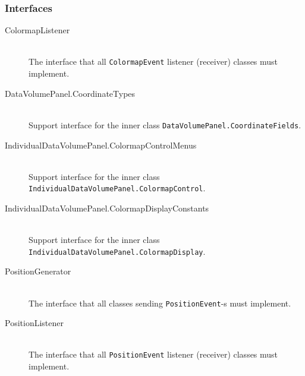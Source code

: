 
\newcommand{\entityintro}[3]{ \item[{#1}] ~\\ {#3} }
\newenvironment{entityenvironment}{\begin{description}}{\end{description}}

%
% 





\subsubsection{Interfaces}
\begin{entityenvironment}
\entityintro{ColormapListener}{l0}{The interface that all {\tt ColormapEvent} listener
 (receiver) classes must implement.}
\entityintro{DataVolumePanel.CoordinateTypes}{l1}{Support interface for the inner class
 {\tt DataVolumePanel.CoordinateFields}.}
\entityintro{IndividualDataVolumePanel.ColormapControlMenus}{l2}{Support interface for the inner class
 {\tt IndividualDataVolumePanel.ColormapControl}.}
\entityintro{IndividualDataVolumePanel.ColormapDisplayConstants}{l3}{Support interface for the inner class
 {\tt IndividualDataVolumePanel.ColormapDisplay}.}
\entityintro{PositionGenerator}{l4}{The interface that all classes sending {\tt PositionEvent}-s
 must implement.}
\entityintro{PositionListener}{l5}{The interface that all {\tt PositionEvent} listener
 (receiver) classes must implement.}
\end{entityenvironment}
   
